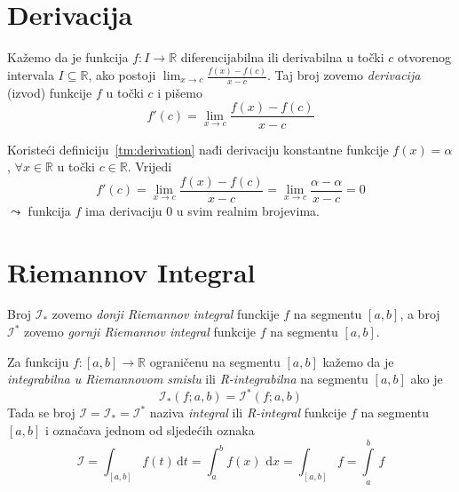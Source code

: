 \documentclass[10pt]{scrartcl}
\newcommand{\D}{\,\mathrm d}
\begin{document}
\section{Derivacija}
\begin{definicija}\label{tm:derivation}
Kažemo da je funkcija  $f\colon I\to \mathbb R$ diferencijabilna ili derivabilna u točki $c$ otvorenog intervala $I \subseteq \mathbb R$, ako postoji $\lim_{x \to c} \frac{f(x) - f(c)}{x-c}$. Taj broj zovemo \emph{derivacija} (izvod) funkcije $f$ u točki $c$ i pišemo 
\begin{equation}
f'(c) = \lim_{x \to c} \frac{f(x) - f(c)}{x-c}
\end{equation}
\end{definicija}
\begin{primjer}
Koristeći definiciju~\ref{tm:derivation} nađi derivaciju konstantne funkcije $f(x) = \alpha$, $\forall x \in \mathbb R$ u točki $c \in \mathbb R$.
Vrijedi
\[
f'(c) = \lim_{x \to c} \frac{f(x) - f(c)}{x-c} = \lim_{x\to c} \frac{\alpha - \alpha}{x-c} = 0
\]
$\leadsto$ funkcija $f$ ima derivaciju $0$ u svim realnim brojevima.
\end{primjer}
%
\section{Riemannov Integral}
\begin{definicija}
Broj $\mathcal{I}_*$ zovemo \emph{donji Riemannov integral} funckije $f$ na segmentu $[a,b]$, a broj $\mathcal{I}^*$ zovemo \emph{gornji Riemannov integral} funkcije $f$ na segmentu $[a,b]$. 
\end{definicija}
\begin{definicija}
Za funkciju $f \colon [a,b] \to \mathbb R$ ograničenu na segmentu $[a,b]$ kažemo da je \emph{integrabilna u Riemannovom smislu} ili \emph{R-integrabilna} na segmentu $[a,b]$ ako je
\begin{equation}
\mathcal{I}_*(f;a,b) = \mathcal{I}^*(f;a,b) 
\end{equation}
Tada se broj $\mathcal{I} = \mathcal{I}_* = \mathcal{I}^* $ naziva \emph{integral} ili \emph{R-integral} funkcije $f$ na segmentu $[a,b]$ i označava jednom od sljedećih oznaka
\begin{equation}
\mathcal{I} = \int_{[a,b]} f(t)\D t = \int_a^b\!f(x)\,\D x = \int_{[a,b]} f = \int\limits_a^b\,f
\end{equation}
\end{definicija}
\end{document}
